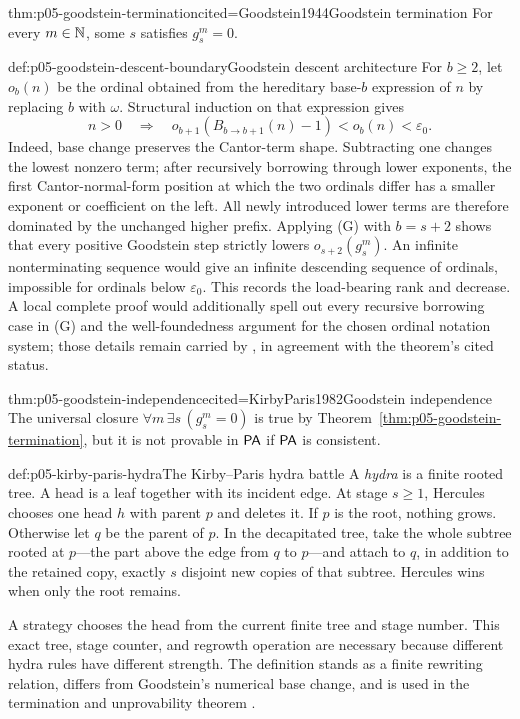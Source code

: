 \begin{hbtheorem}{thm:p05-goodstein-termination}{cited=Goodstein1944}{Goodstein termination}
For every \(m\in\mathbb{N}\), some \(s\) satisfies \(g^m_s=0\).
\end{hbtheorem}

\begin{proofboundary}{def:p05-goodstein-descent-boundary}{Goodstein descent architecture}
For \(b\geq2\), let \(o_b(n)\) be the ordinal obtained from the hereditary
base-\(b\) expression of \(n\) by replacing \(b\) with \(\omega\).  Structural
induction on that expression gives
\[
 n>0\quad\Longrightarrow\quad
 o_{b+1}(B_{b\to b+1}(n)-1)<o_b(n)<\varepsilon_0.       \tag{G}
\]
Indeed, base change preserves the Cantor-term shape.  Subtracting one changes
the lowest nonzero term; after recursively borrowing through lower exponents,
the first Cantor-normal-form position at which the two ordinals differ has a
smaller exponent or coefficient on the left.  All newly introduced lower
terms are therefore dominated by the unchanged higher prefix.  Applying (G)
with \(b=s+2\) shows that every positive Goodstein step strictly lowers
\(o_{s+2}(g^m_s)\).  An infinite nonterminating sequence would give an
infinite descending sequence of ordinals, impossible for ordinals below
\(\varepsilon_0\).  This records the load-bearing rank and decrease.  A local
complete proof would additionally spell out every recursive borrowing case in
(G) and the well-foundedness argument for the chosen ordinal notation system;
those details remain carried by \cite{Goodstein1944,KirbyParis1982}, in
agreement with the theorem's cited status.
\end{proofboundary}

\begin{hbtheorem}{thm:p05-goodstein-independence}{cited=KirbyParis1982}{Goodstein independence}
The universal closure \(\forall m\,\exists s\,(g^m_s=0)\) is true by
Theorem~\ref{thm:p05-goodstein-termination}, but it is not provable in
\(\mathsf{PA}\) if \(\mathsf{PA}\) is consistent.
\end{hbtheorem}

\begin{hbdefinition}{def:p05-kirby-paris-hydra}{The Kirby--Paris hydra battle}
A \emph{hydra} is a finite rooted tree.  A head is a leaf together with its
incident edge.  At stage \(s\geq1\), Hercules chooses one head \(h\) with
parent \(p\) and deletes it.  If \(p\) is the root, nothing grows.  Otherwise
let \(q\) be the parent of \(p\).  In the decapitated tree, take the whole
subtree rooted at \(p\)---the part above the edge from \(q\) to \(p\)---and
attach to \(q\), in addition to the retained copy, exactly \(s\) disjoint new
copies of that subtree.  Hercules wins when only the root remains.

A strategy chooses the head from the current finite tree and stage number.
This exact tree, stage counter, and regrowth operation are necessary because
different hydra rules have different strength.  The definition stands as a
finite rewriting relation, differs from Goodstein's numerical base change,
and is used in the termination and unprovability theorem
\cite{KirbyParis1982}.
\end{hbdefinition}

